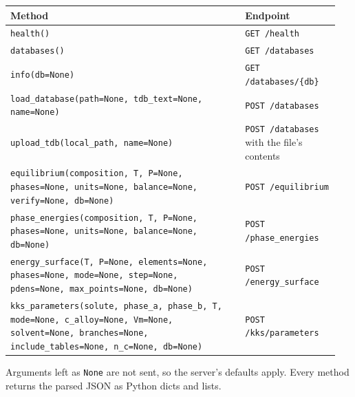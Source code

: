 \documentclass[12pt,a4paper]{article}
\begin{document}
\begingroup\small
\begin{longtable}{>{\raggedright\arraybackslash}p{0.676\linewidth}>{\raggedright\arraybackslash}p{0.271\linewidth}}
\toprule
\textbf{Method} & \textbf{Endpoint} \\
\midrule
\endhead
\texttt{health()} & \texttt{GET /\allowbreak{}health} \\
\texttt{databases()} & \texttt{GET /\allowbreak{}databases} \\
\texttt{info(db=None)} & \texttt{GET /\allowbreak{}databases/\allowbreak{}\{db\}} \\
\texttt{load\_\allowbreak{}database(path=None,\allowbreak{} tdb\_\allowbreak{}text=None,\allowbreak{} name=None)} & \texttt{POST /\allowbreak{}databases} \\
\texttt{upload\_\allowbreak{}tdb(local\_\allowbreak{}path,\allowbreak{} name=None)} & \texttt{POST /\allowbreak{}databases} with the file's contents \\
\texttt{equilibrium(composition,\allowbreak{} T,\allowbreak{} P=None,\allowbreak{} phases=None,\allowbreak{} units=None,\allowbreak{} balance=None,\allowbreak{} verify=None,\allowbreak{} db=None)} & \texttt{POST /\allowbreak{}equilibrium} \\
\texttt{phase\_\allowbreak{}energies(composition,\allowbreak{} T,\allowbreak{} P=None,\allowbreak{} phases=None,\allowbreak{} units=None,\allowbreak{} balance=None,\allowbreak{} db=None)} & \texttt{POST /\allowbreak{}phase\_\allowbreak{}energies} \\
\texttt{energy\_\allowbreak{}surface(T,\allowbreak{} P=None,\allowbreak{} elements=None,\allowbreak{} phases=None,\allowbreak{} mode=None,\allowbreak{} step=None,\allowbreak{} pdens=None,\allowbreak{} max\_\allowbreak{}points=None,\allowbreak{} db=None)} & \texttt{POST /\allowbreak{}energy\_\allowbreak{}surface} \\
\texttt{kks\_\allowbreak{}parameters(solute,\allowbreak{} phase\_\allowbreak{}a,\allowbreak{} phase\_\allowbreak{}b,\allowbreak{} T,\allowbreak{} mode=None,\allowbreak{} c\_\allowbreak{}alloy=None,\allowbreak{} Vm=None,\allowbreak{} solvent=None,\allowbreak{} branches=None,\allowbreak{} include\_\allowbreak{}tables=None,\allowbreak{} n\_\allowbreak{}c=None,\allowbreak{} db=None)} & \texttt{POST /\allowbreak{}kks/\allowbreak{}parameters} \\
\bottomrule
\end{longtable}
\endgroup
Arguments left as \texttt{None} are not sent, so the server's defaults apply. Every method returns the parsed JSON as Python dicts and lists.
\end{document}
